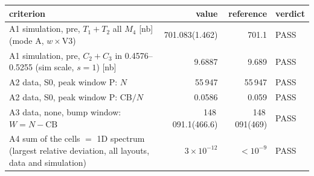 \begin{tabular}{p{}rrl}
\toprule
criterion & value & reference & verdict \\
\midrule
A1 simulation, pre, $T_1{+}T_2$ all $M_4$ [nb] (mode A, $w\times$V3) & 701.083(1.462) & 701.1 & PASS \\
A1 simulation, pre, $C_2{+}C_3$ in 0.4576--0.5255 (sim scale, $s=1$) [nb] & 9.6887 & 9.689 & PASS \\
A2 data, S0, peak window P: $N$ & 55\,947 & 55\,947 & PASS \\
A2 data, S0, peak window P: CB$/N$ & 0.0586 & 0.059 & PASS \\
A3 data, none, bump window: $W = N - \mathrm{CB}$ & 148\,091.1(466.6) & 148\,091(469) & PASS \\
A4 sum of the cells $=$ 1D spectrum (largest relative deviation, all layouts, data and simulation) & $3\times10^{-12}$ & $<10^{-9}$ & PASS \\
\bottomrule
\end{tabular}
